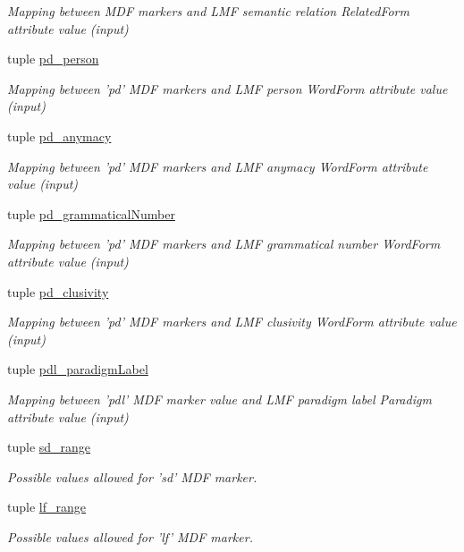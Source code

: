 \begin{DoxyCompactItemize}
\begin{DoxyCompactList}\small\item\em Mapping between M\+D\+F markers and L\+M\+F semantic relation Related\+Form attribute value (input) \end{DoxyCompactList}\item 
tuple \hyperlink{namespacelmf_1_1src_1_1config_1_1mdf_ab58fb9b58bc32ac36efe9b26e4ea3ca2}{pd\+\_\+person}
\begin{DoxyCompactList}\small\item\em Mapping between 'pd' M\+D\+F markers and L\+M\+F person Word\+Form attribute value (input) \end{DoxyCompactList}\item 
tuple \hyperlink{namespacelmf_1_1src_1_1config_1_1mdf_a011f241f41e3620deefe53cbb42286b9}{pd\+\_\+anymacy}
\begin{DoxyCompactList}\small\item\em Mapping between 'pd' M\+D\+F markers and L\+M\+F anymacy Word\+Form attribute value (input) \end{DoxyCompactList}\item 
tuple \hyperlink{namespacelmf_1_1src_1_1config_1_1mdf_a64be26974728c369cd72ef80bd297154}{pd\+\_\+grammatical\+Number}
\begin{DoxyCompactList}\small\item\em Mapping between 'pd' M\+D\+F markers and L\+M\+F grammatical number Word\+Form attribute value (input) \end{DoxyCompactList}\item 
tuple \hyperlink{namespacelmf_1_1src_1_1config_1_1mdf_ac57ebe92cdf841d8d1bfe1e1b94b96bb}{pd\+\_\+clusivity}
\begin{DoxyCompactList}\small\item\em Mapping between 'pd' M\+D\+F markers and L\+M\+F clusivity Word\+Form attribute value (input) \end{DoxyCompactList}\item 
tuple \hyperlink{namespacelmf_1_1src_1_1config_1_1mdf_a8e61adc475ca415a33c85ef16c96d03d}{pdl\+\_\+paradigm\+Label}
\begin{DoxyCompactList}\small\item\em Mapping between 'pdl' M\+D\+F marker value and L\+M\+F paradigm label Paradigm attribute value (input) \end{DoxyCompactList}\item 
tuple \hyperlink{namespacelmf_1_1src_1_1config_1_1mdf_a69afee1e13ba980f4da1e6d7fb0c488a}{sd\+\_\+range}
\begin{DoxyCompactList}\small\item\em Possible values allowed for 'sd' M\+D\+F marker. \end{DoxyCompactList}\item 
tuple \hyperlink{namespacelmf_1_1src_1_1config_1_1mdf_a61a24538d210d4eca3f57f183733fa5a}{lf\+\_\+range}
\begin{DoxyCompactList}\small\item\em Possible values allowed for 'lf' M\+D\+F marker. \end{DoxyCompactList}\end{DoxyCompactItemize}


